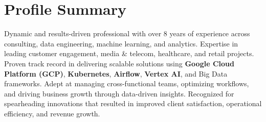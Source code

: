 \section{Profile Summary}
\vspace{-10pt}
\small{
    Dynamic and results-driven professional with over 8 years of experience across consulting, data engineering, machine learning, and analytics. Expertise in leading customer engagement, media \& telecom, healthcare, and retail projects. Proven track record in delivering scalable solutions using \textbf{Google Cloud Platform (GCP)}, \textbf{Kubernetes}, \textbf{Airflow}, \textbf{Vertex AI}, and Big Data frameworks. Adept at managing cross-functional teams, optimizing workflows, and driving business growth through data-driven insights. Recognized for spearheading innovations that resulted in improved client satisfaction, operational efficiency, and revenue growth.
}
\vspace{-2pt}

